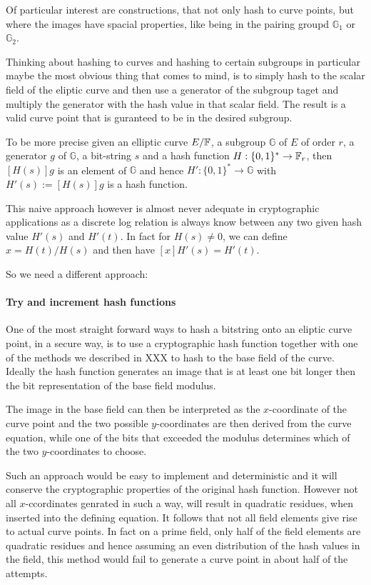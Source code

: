 Of particular interest are constructions, that not only hash to curve points, but where the images have spacial properties, like being in the pairing groupd $\mathbb{G}_1$ or $\mathbb{G}_2$.

Thinking about hashing to curves and hashing to certain subgroups in particular maybe the most obvious thing that comes to mind, is to simply hash to the scalar field of the eliptic curve and then use a generator of the subgroup taget and multiply the generator with the hash value in that scalar field. The result is a valid curve point that is guranteed to be in the desired subgroup. 

To be more precise given an elliptic curve $E/\mathbb{F}$, a subgroup $\mathbb{G}$ of $E$ of order $r$, a generator $g$ of $\mathbb{G}$, a bit-string $s$ and a hash function $H: \{0,1\}^* \to \mathbb{F}_{r}$, then $[H(s)]g$ is an element of $\mathbb{G}$ and hence $H':  \{0,1\}^* \to \mathbb{G}$ with $H'(s):= [H(s)]g$ is a hash function. 

This naive approach however is almost never adequate in cryptographic applications as a discrete log relation is always know between any two given hash value $H'(s)$ and $H'(t)$. In fact for $H(s)\neq 0$, we can define $x= H(t)/H(s)$ and then have $[x]H'(s)=H'(t)$.

So we need a different approach:
\paragraph{Try and increment hash functions}
One of the most straight forward ways to hash a bitstring onto an eliptic curve point, in a  secure way, is to use a cryptographic hash function together with one of the methods we described in XXX to hash to the base field of the curve. Ideally the hash function generates an image that is at least one bit longer then the bit representation of the base field modulus.

The image in the base field can then be interpreted as the $x$-coordinate of the curve point and the two possible $y$-coordinates are then derived from the curve equation, while one of the bits that exceeded the modulus determines which of the two $y$-coordinates to choose.

Such an approach would be easy to implement and deterministic and it will conserve the cryptographic properties of the original hash function. However not all $x$-ccordinates genrated in such a way, will result in quadratic residues, when inserted into the defining equation. It follows that not all field elements give rise to actual curve points. In fact
on a prime field, only half of the field elements are quadratic residues and hence assuming an even distribution of the hash values in the field, this method would fail to generate a curve point in about half of the attempts. 

